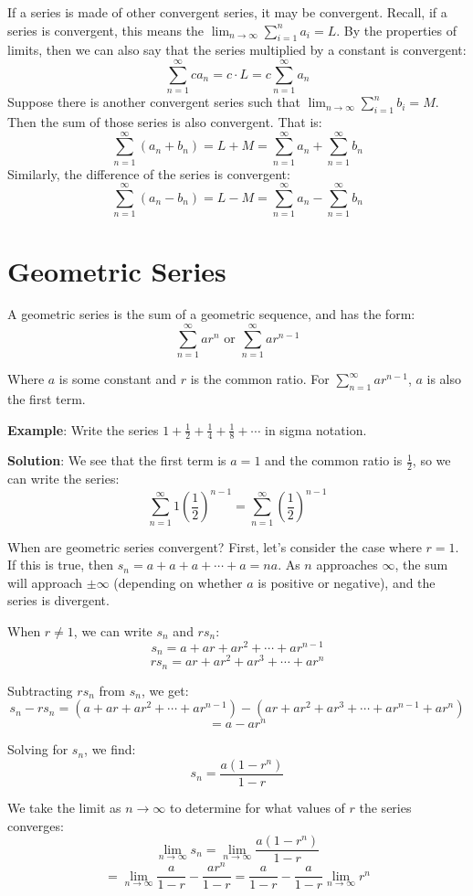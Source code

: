 If a series is made of other convergent series, it may be convergent. Recall, 
if a series is convergent, this means the $\lim_{n \to \infty} \sum_{i=1}^n 
a_i = L$. By the properties of limits, then we can also say that the series 
multiplied by a constant is convergent:
$$\sum_{n=1}^\infty ca_n = c \cdot L = c \sum_{n=1}^\infty a_n$$
Suppose there is another convergent series such that $\lim_{n \to \infty} 
\sum_{i=1}^n b_i = M$. Then the sum of those series is also convergent. That is:
$$\sum_{n=1}^\infty \left( a_n + b_n \right) = L + M = \sum_{n=1}^\infty a_n + 
\sum_{n=1}^\infty b_n$$
Similarly, the difference of the series is convergent:
$$\sum_{n=1}^\infty \left( a_n - b_n \right) = L - M = \sum_{n=1}^\infty a_n - 
\sum_{n=1}^\infty b_n$$

\section{Geometric Series}

A geometric series is the sum of a geometric sequence, and has the form:
$$\sum_{n=1}^\infty ar^n \text{ or } \sum_{n=1}^\infty ar^{n-1}$$

Where $a$ is some constant and $r$ is the common ratio. For $\sum_{n=1}^\infty 
ar^{n-1}$, $a$ is also the first term. 

\textbf{Example}: Write the series $1 + \frac{1}{2} + \frac{1}{4} + 
\frac{1}{8} + \cdots$ in sigma notation.

\textbf{Solution}: We see that the first term is $a=1$ and the common ratio is 
$\frac{1}{2}$, so we can write the series: $$\sum_{n=1}^\infty 1(\frac{1}{2})^
{n-1} = \sum_{n=1}^\infty (\frac{1}{2})^{n-1}$$

When are geometric series convergent? First, let's consider the case 
where $r=1$. If this is true, then $s_n = a + a + a + \cdots + a = 
na$. As $n$ approaches $\infty$, the sum will approach $\pm \infty$ 
(depending on whether $a$ is positive or negative), and the series is 
divergent. 

When $r \neq 1$, we can write $s_n$ and $rs_n$:
$$s_n = a + ar + ar^2 + \cdots + ar^{n-1}$$
$$rs_n = ar + ar^2 + ar^3 + \cdots + ar^n$$

Subtracting $rs_n$ from $s_n$, we get:
$$s_n - rs_n = (a + ar + ar^2 + \cdots + ar^{n-1}) - (ar + ar^2 + 
ar^3 + \cdots + ar^{n-1} + ar^n)$$
$$= a - ar^n$$

Solving for $s_n$, we find:
$$s_n = \frac{a(1-r^n)}{1-r}$$

We take the limit as $n \to \infty$ to determine for what values of 
$r$ the series converges:
$$\lim_{n \to \infty} s_n = \lim_{n \to \infty} \frac{a(1-r^n)}{1-r}$$
$$= \lim_{n\to \infty} \frac{a}{1-r} - \frac{ar^n}{1-r} = \frac{a}{1-r} 
- \frac{a}{1-r}\lim_{n \to \infty} r^n$$

